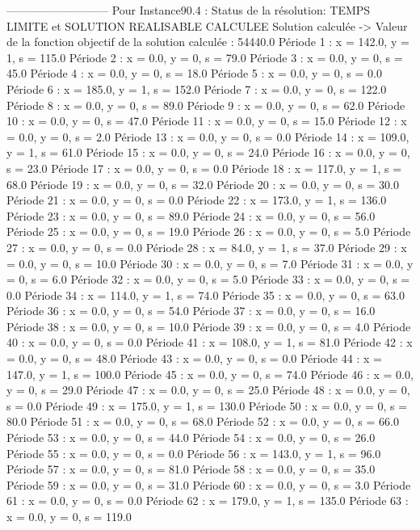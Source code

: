 ---------------------------
Pour Instance90.4  :
Status de la résolution: TEMPS LIMITE et SOLUTION REALISABLE CALCULEE
Solution calculée
-> Valeur de la fonction objectif de la solution calculée :  54440.0
Période 1 : x = 142.0, y = 1, s = 115.0
Période 2 : x = 0.0, y = 0, s = 79.0
Période 3 : x = 0.0, y = 0, s = 45.0
Période 4 : x = 0.0, y = 0, s = 18.0
Période 5 : x = 0.0, y = 0, s = 0.0
Période 6 : x = 185.0, y = 1, s = 152.0
Période 7 : x = 0.0, y = 0, s = 122.0
Période 8 : x = 0.0, y = 0, s = 89.0
Période 9 : x = 0.0, y = 0, s = 62.0
Période 10 : x = 0.0, y = 0, s = 47.0
Période 11 : x = 0.0, y = 0, s = 15.0
Période 12 : x = 0.0, y = 0, s = 2.0
Période 13 : x = 0.0, y = 0, s = 0.0
Période 14 : x = 109.0, y = 1, s = 61.0
Période 15 : x = 0.0, y = 0, s = 24.0
Période 16 : x = 0.0, y = 0, s = 23.0
Période 17 : x = 0.0, y = 0, s = 0.0
Période 18 : x = 117.0, y = 1, s = 68.0
Période 19 : x = 0.0, y = 0, s = 32.0
Période 20 : x = 0.0, y = 0, s = 30.0
Période 21 : x = 0.0, y = 0, s = 0.0
Période 22 : x = 173.0, y = 1, s = 136.0
Période 23 : x = 0.0, y = 0, s = 89.0
Période 24 : x = 0.0, y = 0, s = 56.0
Période 25 : x = 0.0, y = 0, s = 19.0
Période 26 : x = 0.0, y = 0, s = 5.0
Période 27 : x = 0.0, y = 0, s = 0.0
Période 28 : x = 84.0, y = 1, s = 37.0
Période 29 : x = 0.0, y = 0, s = 10.0
Période 30 : x = 0.0, y = 0, s = 7.0
Période 31 : x = 0.0, y = 0, s = 6.0
Période 32 : x = 0.0, y = 0, s = 5.0
Période 33 : x = 0.0, y = 0, s = 0.0
Période 34 : x = 114.0, y = 1, s = 74.0
Période 35 : x = 0.0, y = 0, s = 63.0
Période 36 : x = 0.0, y = 0, s = 54.0
Période 37 : x = 0.0, y = 0, s = 16.0
Période 38 : x = 0.0, y = 0, s = 10.0
Période 39 : x = 0.0, y = 0, s = 4.0
Période 40 : x = 0.0, y = 0, s = 0.0
Période 41 : x = 108.0, y = 1, s = 81.0
Période 42 : x = 0.0, y = 0, s = 48.0
Période 43 : x = 0.0, y = 0, s = 0.0
Période 44 : x = 147.0, y = 1, s = 100.0
Période 45 : x = 0.0, y = 0, s = 74.0
Période 46 : x = 0.0, y = 0, s = 29.0
Période 47 : x = 0.0, y = 0, s = 25.0
Période 48 : x = 0.0, y = 0, s = 0.0
Période 49 : x = 175.0, y = 1, s = 130.0
Période 50 : x = 0.0, y = 0, s = 80.0
Période 51 : x = 0.0, y = 0, s = 68.0
Période 52 : x = 0.0, y = 0, s = 66.0
Période 53 : x = 0.0, y = 0, s = 44.0
Période 54 : x = 0.0, y = 0, s = 26.0
Période 55 : x = 0.0, y = 0, s = 0.0
Période 56 : x = 143.0, y = 1, s = 96.0
Période 57 : x = 0.0, y = 0, s = 81.0
Période 58 : x = 0.0, y = 0, s = 35.0
Période 59 : x = 0.0, y = 0, s = 31.0
Période 60 : x = 0.0, y = 0, s = 3.0
Période 61 : x = 0.0, y = 0, s = 0.0
Période 62 : x = 179.0, y = 1, s = 135.0
Période 63 : x = 0.0, y = 0, s = 119.0
